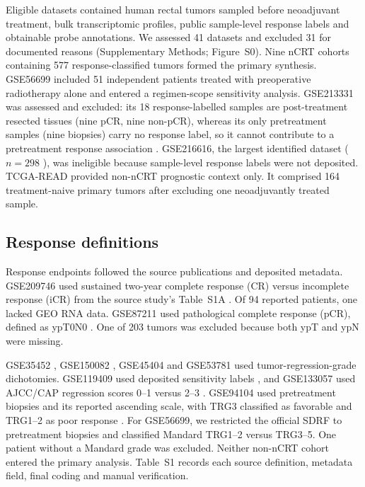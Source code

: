 \documentclass[11pt,a4paper]{article}
\begin{document}
Eligible datasets contained human rectal tumors sampled before neoadjuvant treatment, bulk transcriptomic profiles, public sample-level response labels and obtainable probe annotations. We assessed 41 datasets and excluded 31 for documented reasons (Supplementary Methods; Figure~S0). Nine nCRT cohorts containing 577 response-classified tumors formed the primary synthesis. GSE56699 included 51 independent patients treated with preoperative radiotherapy alone \cite{Isella} and entered a regimen-scope sensitivity analysis. GSE213331 was assessed and excluded: its 18 response-labelled samples are post-treatment resected tissues (nine pCR, nine non-pCR), whereas its only pretreatment samples (nine biopsies) carry no response label, so it cannot contribute to a pretreatment response association \cite{He}. GSE216616, the largest identified dataset ($n=298$ \cite{Akiyoshi}), was ineligible because sample-level response labels were not deposited. TCGA-READ provided non-nCRT prognostic context only. It comprised 164 treatment-naive primary tumors after excluding one neoadjuvantly treated sample.

\subsection{Response definitions}

Response endpoints followed the source publications and deposited metadata. GSE209746 used sustained two-year complete response (CR) versus incomplete response (iCR) from the source study's Table~S1A \cite{Chatila}. Of 94 reported patients, one lacked GEO RNA data. GSE87211 used pathological complete response (pCR), defined as ypT0N0 \cite{Hu}. One of 203 tumors was excluded because both ypT and ypN were missing.

GSE35452 \cite{Watanabe}, GSE150082 \cite{Sendoya}, GSE45404 \cite{Agostini} and GSE53781 \cite{Palma} used tumor-regression-grade dichotomies. GSE119409 used deposited sensitivity labels \cite{Ji}, and GSE133057 used AJCC/CAP regression scores 0--1 versus 2--3 \cite{Ferrandon}. GSE94104 used pretreatment biopsies and its reported ascending scale, with TRG3 classified as favorable and TRG1--2 as poor response \cite{Alderdice}. For GSE56699, we restricted the official SDRF to pretreatment biopsies and classified Mandard TRG1--2 versus TRG3--5. One patient without a Mandard grade was excluded. Neither non-nCRT cohort entered the primary analysis. Table~S1 records each source definition, metadata field, final coding and manual verification.
\end{document}
